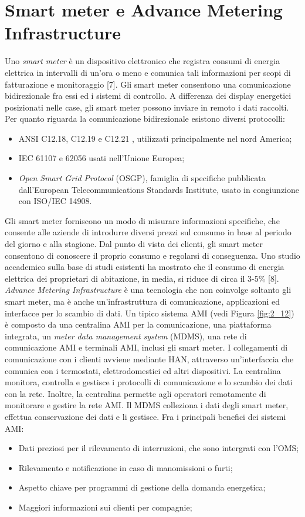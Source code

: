 \section{Smart meter e Advance Metering Infrastructure}
Uno \emph{smart meter} è un dispositivo elettronico che registra consumi di energia elettrica in intervalli di un'ora o meno e comunica tali informazioni per scopi di fatturazione e monitoraggio [7]. Gli smart meter consentono una comunicazione bidirezionale fra essi ed i sistemi di controllo. A differenza dei display energetici posizionati nelle case, gli smart meter possono inviare in remoto i dati raccolti. 
\\
Per quanto riguarda la comunicazione bidirezionale esistono diversi protocolli:
\begin{itemize}
	\item ANSI C12.18, C12.19 e C12.21 , utilizzati principalmente nel nord America;
	\item IEC 61107 e 62056 usati nell'Unione Europea;
	\item  \emph{Open Smart Grid Protocol} (OSGP), famiglia di specifiche pubblicata dall'European Telecommunications Standards Institute, usato in congiunzione con ISO/IEC 14908.
\end{itemize}
Gli smart meter forniscono un modo di misurare informazioni specifiche, che consente alle aziende di introdurre diversi prezzi sul consumo in base al periodo del giorno e alla stagione. Dal punto di vista dei clienti, gli smart meter consentono di conoscere il proprio consumo e regolarsi di conseguenza. Uno studio accademico sulla base di studi esistenti ha mostrato che il consumo di energia elettrica dei proprietari di abitazione, in media, si riduce di circa il 3-5\% [8].
\emph{Advance Metering Infrastructure} è una tecnologia che non coinvolge soltanto gli smart meter, ma è anche un'infrastruttura di comunicazione, applicazioni ed interfacce  per lo scambio di dati. Un tipico sistema AMI (vedi Figura \ref{fig:2_12}) è composto da una centralina AMI per la comunicazione, una piattaforma integrata, un \emph{meter data management system} (MDMS), una rete di comunicazione AMI e terminali AMI, inclusi gli smart meter. I collegamenti di comunicazione con i clienti avviene mediante HAN, attraverso un'interfaccia che comunica con i termostati, elettrodomestici ed altri dispositivi. La centralina monitora, controlla e gestisce i protocolli di comunicazione e lo scambio dei dati con la rete. Inoltre, la centralina permette agli operatori remotamente di monitorare  e gestire la rete AMI. Il MDMS colleziona i dati degli smart meter, effettua conservazione dei dati e li gestisce.
Fra i principali benefici dei sistemi AMI:
\begin{itemize}
	\item Dati preziosi per il rilevamento di interruzioni, che sono intergrati con l'OMS;
	\item Rilevamento e notificazione in caso di manomissioni o furti;
	\item Aspetto chiave per programmi di gestione della domanda energetica;
	\item Maggiori informazioni sui clienti per compagnie;
\end{itemize}

